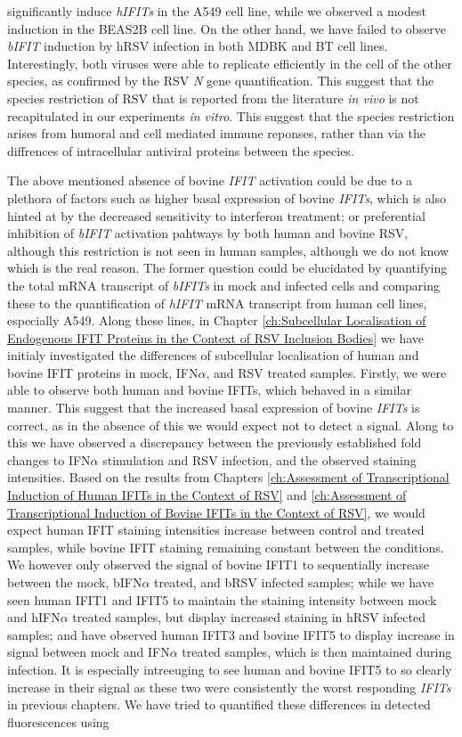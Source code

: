 significantly induce \textit{hIFITs} in the A549 cell line, while we observed a modest induction in the BEAS2B cell line. On the other hand, we have failed to observe \textit{bIFIT} induction by hRSV infection in both MDBK and BT cell lines. Interestingly, both viruses were able to replicate efficiently in the cell of the other species, as confirmed by the RSV \textit{N} gene quantification. This suggest that the species restriction of RSV that is reported from the literature \textit{in vivo} is not recapitulated in our experiments \textit{in vitro}. This suggest that the species restriction arises from humoral and cell mediated immune reponses, rather than via the diffrences of intracellular antiviral proteins between the species.

% 
The above mentioned absence of bovine \textit{IFIT} activation could be due to a plethora of factors such as higher basal expression of bovine \textit{IFITs}, which is also hinted at by the decreased sensitivity to interferon treatment; or preferential inhibition of \textit{bIFIT} activation pahtways by both human and bovine RSV, although this restriction is not seen in human samples, although we do not know which is the real reason. The former question could be elucidated by quantifying the total mRNA transcript of \textit{bIFITs} in mock and infected cells and comparing these to the quantification of \textit{hIFIT} mRNA transcript from human cell lines, especially A549. Along these lines, in Chapter \ref{ch:Subcellular Localisation of Endogenous IFIT Proteins in the Context of RSV Inclusion Bodies} we have initialy investigated the differences of subcellular localisation of human and bovine IFIT proteins in mock, IFN$\alpha$, and RSV treated samples. Firstly, we were able to observe both human and bovine IFITs, which behaved in a similar manner. This suggest that the increased basal expression of bovine \textit{IFITs} is correct, as in the absence of this we would expect not to detect a signal. Along to this we have observed a discrepancy between the previously established fold changes to IFN$\alpha$ stimulation and RSV infection, and the observed staining intensities. Based on the results from Chapters \ref{ch:Assessment of Transcriptional Induction of Human IFITs in the Context of RSV} and \ref{ch:Assessment of Transcriptional Induction of Bovine IFITs in the Context of RSV}, we would expect human IFIT staining intensities increase between control and treated samples, while bovine IFIT staining remaining constant between the conditions. We however only observed the signal of bovine IFIT1 to sequentially increase between the mock, bIFN$\alpha$ treated, and bRSV infected samples; while we have seen human IFIT1 and IFIT5 to maintain the staining intensity between mock and hIFN$\alpha$ treated samples, but display increased staining in hRSV infected samples; and have observed human IFIT3 and bovine IFIT5 to display increase in signal between mock and IFN$\alpha$ treated samples, which is then maintained during infection. It is especially intreeuging to see human and bovine IFIT5 to so clearly increase in their signal as these two were consistently the worst responding \textit{IFITs} in previous chapters. We have tried to quantified these differences in detected fluorescences using 